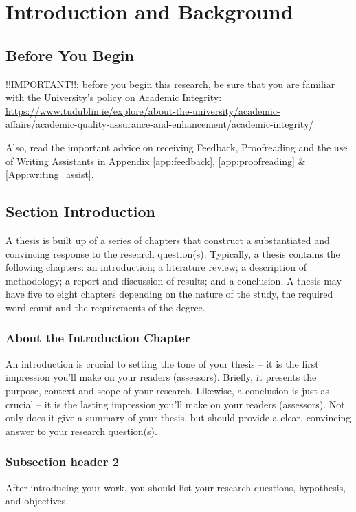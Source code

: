 
\chapter{Introduction and Background}
\label{sec:introduction}

\label{Chapter1} %

\section{Before You Begin}
!!IMPORTANT!!: before you begin this research, be sure that you are familiar with the University's policy on Academic Integrity: \url{https://www.tudublin.ie/explore/about-the-university/academic-affairs/academic-quality-assurance-and-enhancement/academic-integrity/}

Also, read the important advice on receiving Feedback, Proofreading and the use
of Writing Assistants in Appendix \ref{app:feedback}, \ref{app:proofreading} \&
\ref{App:writing_assist}.

\section{Section Introduction}
A thesis is built up of a series of chapters that construct a substantiated and
convincing response to the research question(s). Typically, a thesis contains
the following chapters: an introduction; a literature review; a description of
methodology; a report and discussion of results; and a conclusion. A thesis may
have five to eight chapters depending on the nature of the study, the required
word count and the requirements of the degree.

\subsection{About the Introduction Chapter}
An introduction is crucial to setting the tone of your thesis – it is the first
impression you’ll make on your readers (assessors). Briefly, it presents the
purpose, context and scope of your research. Likewise, a conclusion is just as
crucial – it is the lasting impression you’ll make on your readers (assessors).
Not only does it give a summary of your thesis, but should provide a clear,
convincing answer to your research question(s).
\subsection{Subsection header 2}
After introducing your work, you should list your research questions,
hypothesis, and objectives.


